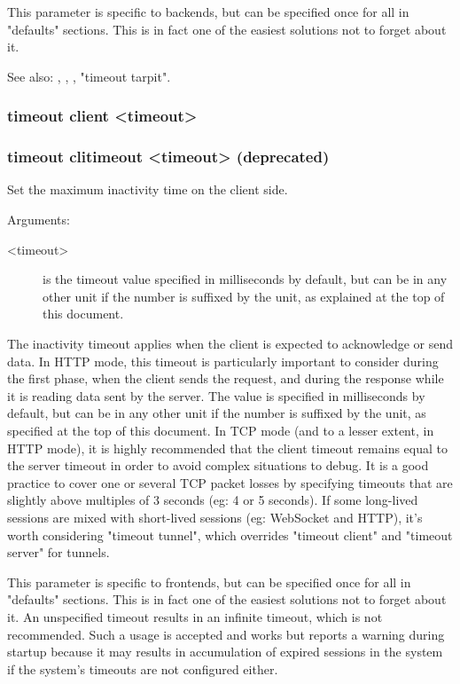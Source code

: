   This parameter is specific to backends, but can be specified once for all in
  "defaults" sections. This is in fact one of the easiest solutions not to
  forget about it.

  See also: , , ,
            "timeout tarpit".

\subsubsection[timeout client]{timeout client <timeout>}
\subsubsection[timeout clitimeout]{timeout clitimeout <timeout> (deprecated)}


  Set the maximum inactivity time on the client side.


  Arguments:
  \begin{description}
  \item[<timeout>] is the timeout value specified in milliseconds by default, but
              can be in any other unit if the number is suffixed by the unit,
              as explained at the top of this document.
  \end{description}

  The inactivity timeout applies when the client is expected to acknowledge or
  send data. In HTTP mode, this timeout is particularly important to consider
  during the first phase, when the client sends the request, and during the
  response while it is reading data sent by the server. The value is specified
  in milliseconds by default, but can be in any other unit if the number is
  suffixed by the unit, as specified at the top of this document. In TCP mode
  (and to a lesser extent, in HTTP mode), it is highly recommended that the
  client timeout remains equal to the server timeout in order to avoid complex
  situations to debug. It is a good practice to cover one or several TCP packet
  losses by specifying timeouts that are slightly above multiples of 3 seconds
  (eg: 4 or 5 seconds). If some long-lived sessions are mixed with short-lived
  sessions (eg: WebSocket and HTTP), it's worth considering "timeout tunnel",
  which overrides "timeout client" and "timeout server" for tunnels.

  This parameter is specific to frontends, but can be specified once for all in
  "defaults" sections. This is in fact one of the easiest solutions not to
  forget about it. An unspecified timeout results in an infinite timeout, which
  is not recommended. Such a usage is accepted and works but reports a warning
  during startup because it may results in accumulation of expired sessions in
  the system if the system's timeouts are not configured either.


